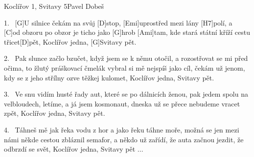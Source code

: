 \begin{song}{Koclířov 1, Svitavy 5}{Pavel Dobeš}

\begin{xverse}{1.~}
[G]U silnice čekám na svůj [D]stop,
[Emi]uprostřed mezi lány [H7]polí,
a [C]od obzoru po obzor je ticho jako [G]hrob
[Ami]tam, kde stará státní kříží cestu třicet[D]pět,
Koclířov jedna, [G]Svitavy pět.
\end{xverse}

\begin{xverse}{2.~}
Pak slunce začlo bzučet, když jsem se k němu otočil,
a rozostřovat se mi před očima,
to žlutý práškovací čmelák vybral si mě nejspíš jako cíl,
čekám už jenom, kdy se z jeho střílny ozve těžkej kulomet,
Koclířov jedna, Svitavy pět.
\end{xverse}

\begin{xverse}{3.~}
Ve snu vidím husté řady aut,
které se po dálnicích ženou,
pak jedem spolu na velbloudech, letíme, a já jsem kosmonaut,
dneska už se přece nebudeme vracet zpět,
Koclířov jedna, Svitavy pět.
\end{xverse}

\begin{xverse}{4.~}
Táhneš mě jak řeka vodu z hor
a jako řeku táhne moře,
možná se jen mezi námi někde cestou zbláznil semafor,
a někdo už zařídí, že auta začnou jezdit, že odbrzdí se svět,
Koclířov jedna, Svitavy pět ...
\end{xverse}
\end{song}



